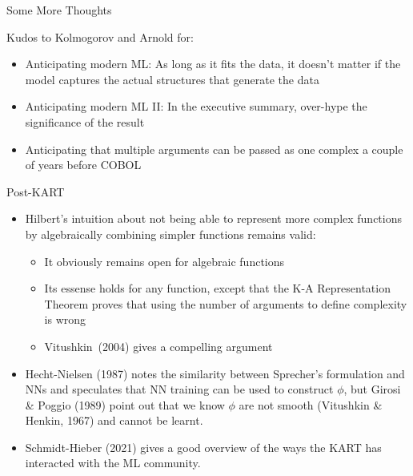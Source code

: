 \begin{frame}{Some More Thoughts}

Kudos to Kolmogorov and Arnold for:
\vspace{0.5em}
\begin{itemize}
\item Anticipating modern ML: As long as it fits the data, it doesn't
  matter if the model captures the actual structures that generate the data \vspace{0.5em}
\item Anticipating modern ML II: In the executive summary, over-hype
  the significance of the result \vspace{0.5em}
\item Anticipating that multiple arguments can be passed as one complex
   a couple of years before COBOL \vspace{0.5em}
\end{itemize}

\end{frame}



\begin{frame}{Post-KART}

\begin{itemize}
\item Hilbert's intuition about not being able to represent more
  complex functions by algebraically combining simpler functions remains valid:
  \begin{itemize}
  \item It obviously remains open for algebraic functions
  \item Its essense holds for any function, except that the K-A
    Representation Theorem proves that using the number of arguments
    to define complexity is wrong
  \item Vitushkin~(2004) gives a compelling argument
  \end{itemize}
\vspace{0.5em}
\item Hecht-Nielsen (1987) notes the similarity between Sprecher's
  formulation and NNs and speculates that NN training can be used to
  construct $\phi$, but Girosi \& Poggio (1989) point out that we know
  $\phi$ are not smooth (Vitushkin \& Henkin, 1967) and cannot be
  learnt.
\vspace{0.5em}
\item Schmidt-Hieber (2021) gives a good overview of the ways the KART
  has interacted with the ML community.
  
\end{itemize}

\end{frame}
